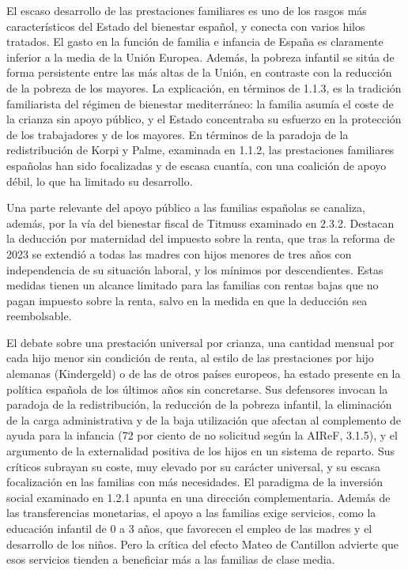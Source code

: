 \documentclass[10pt,a4paper]{article}
\begin{document}
El escaso desarrollo de las prestaciones familiares es uno de los rasgos más característicos del Estado del bienestar español, y conecta con varios hilos tratados. El gasto en la función de familia e infancia de España es claramente inferior a la media de la Unión Europea. Además, la pobreza infantil se sitúa de forma persistente entre las más altas de la Unión, en contraste con la reducción de la pobreza de los mayores. La explicación, en términos de 1.1.3, es la tradición familiarista del régimen de bienestar mediterráneo: la familia asumía el coste de la crianza sin apoyo público, y el Estado concentraba su esfuerzo en la protección de los trabajadores y de los mayores. En términos de la paradoja de la redistribución de Korpi y Palme, examinada en 1.1.2, las prestaciones familiares españolas han sido focalizadas y de escasa cuantía, con una coalición de apoyo débil, lo que ha limitado su desarrollo.

Una parte relevante del apoyo público a las familias españolas se canaliza, además, por la vía del bienestar fiscal de Titmuss examinado en 2.3.2. Destacan la deducción por maternidad del impuesto sobre la renta, que tras la reforma de 2023 se extendió a todas las madres con hijos menores de tres años con independencia de su situación laboral, y los mínimos por descendientes. Estas medidas tienen un alcance limitado para las familias con rentas bajas que no pagan impuesto sobre la renta, salvo en la medida en que la deducción sea reembolsable.

El debate sobre una prestación universal por crianza, una cantidad mensual por cada hijo menor sin condición de renta, al estilo de las prestaciones por hijo alemanas (Kindergeld) o de las de otros países europeos, ha estado presente en la política española de los últimos años sin concretarse. Sus defensores invocan la paradoja de la redistribución, la reducción de la pobreza infantil, la eliminación de la carga administrativa y de la baja utilización que afectan al complemento de ayuda para la infancia (72 por ciento de no solicitud según la AIReF, 3.1.5), y el argumento de la externalidad positiva de los hijos en un sistema de reparto. Sus críticos subrayan su coste, muy elevado por su carácter universal, y su escasa focalización en las familias con más necesidades. El paradigma de la inversión social examinado en 1.2.1 apunta en una dirección complementaria. Además de las transferencias monetarias, el apoyo a las familias exige servicios, como la educación infantil de 0 a 3 años, que favorecen el empleo de las madres y el desarrollo de los niños. Pero la crítica del efecto Mateo de Cantillon advierte que esos servicios tienden a beneficiar más a las familias de clase media.
\end{document}
